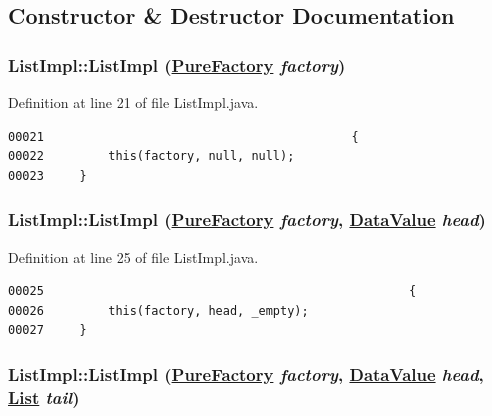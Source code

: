 \subsection{Constructor \& Destructor Documentation}
\hypertarget{classListImpl_c0}{
\subsubsection[ListImpl]{\setlength{\rightskip}{0pt plus 5cm}List\-Impl::List\-Impl (\hyperlink{classPureFactory}{Pure\-Factory} {\em factory})}}
\label{classListImpl_c0}




Definition at line 21 of file List\-Impl.java.\footnotesize\begin{verbatim}00021                                           {
00022         this(factory, null, null);
00023     }
\end{verbatim}\normalsize 
\hypertarget{classListImpl_c1}{
\subsubsection[ListImpl]{\setlength{\rightskip}{0pt plus 5cm}List\-Impl::List\-Impl (\hyperlink{classPureFactory}{Pure\-Factory} {\em factory}, \hyperlink{interfaceDataValue}{Data\-Value} {\em head})}}
\label{classListImpl_c1}




Definition at line 25 of file List\-Impl.java.\footnotesize\begin{verbatim}00025                                                   {
00026         this(factory, head, _empty);
00027     }
\end{verbatim}\normalsize 
\hypertarget{classListImpl_c2}{
\subsubsection[ListImpl]{\setlength{\rightskip}{0pt plus 5cm}List\-Impl::List\-Impl (\hyperlink{classPureFactory}{Pure\-Factory} {\em factory}, \hyperlink{interfaceDataValue}{Data\-Value} {\em head}, \hyperlink{interfaceList}{List} {\em tail})}}
\label{classListImpl_c2}




